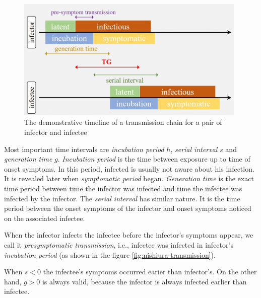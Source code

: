 \documentclass[
  digital, %
  oneside, %
  lof,     %
  lot,     %
]{fithesis4}
\begin{document}
\begin{figure}[H]
  \begin{center}
    \includegraphics[width=11cm]{static/images/zhao2020_terms.png}
  \end{center}
  \caption{The demonstrative timeline of a transmission chain for a pair of infector and infectee \cite{zhao2020}}
  \label{fig:zhao-transmissive-chain-example}
\end{figure}

Most important time intervals are 
\textit{incubation period} $h$, \textit{serial interval} $s$ and \textit{generation time} $g$.
\textit{Incubation period} is the time between exposure up to time of onset 
symptoms. In this period, infected is usually not aware about his infection.
It is revealed later when \textit{symptomatic period} began.
\textit{Generation time} is the exact time period between time
the infector was infected and time the infectee was infected by the infector.
The \textit{serial interval} has similar nature. It is 
the time period between the onset symptoms of the infector 
and onset symptoms noticed on the associated infectee.


When the infector infects the infectee before the infector's
symptoms appear, we call it \textit{presymptomatic transmission}, i.e.,
infectee was infected in infector's \textit{incubation period}
(as shown in the figure \ref{fig:nishiura-transmission}).

When $s < 0$ the infectee's symptoms occurred earier than infector's.
On the other hand, $g > 0$ is always
valid, because the infector is always infected earlier than infectee.
\end{document}

